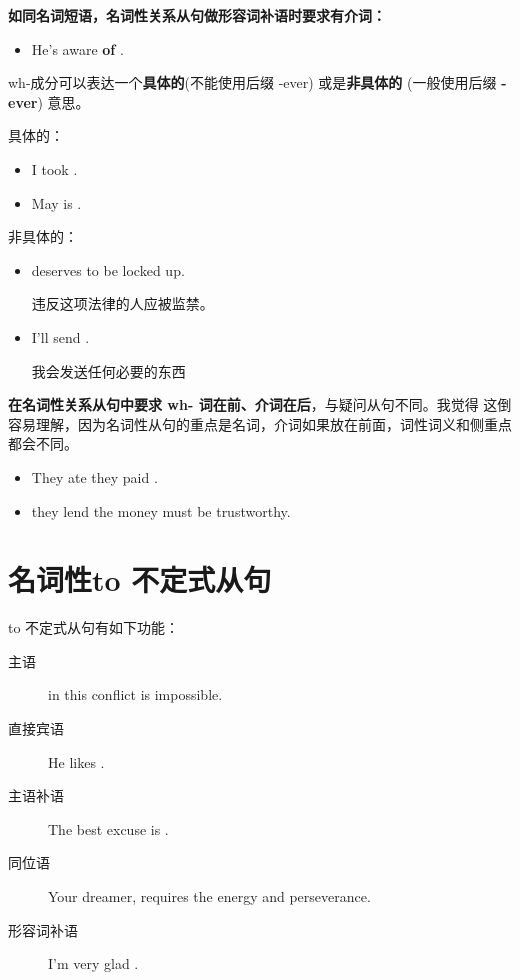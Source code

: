 \textbf{如同名词短语，名词性关系从句做形容词补语时要求有介词：}
\begin{itemize}
\item He's aware \textbf{of} .
\end{itemize}

wh-成分可以表达一个\textbf{具体的}(不能使用后缀 -ever) 或是\textbf{非具体的}
(一般使用后缀 \textbf{-ever}) 意思。

具体的：
\begin{itemize}
\item I took .
\item May is .
\end{itemize}


非具体的：
\begin{itemize}
\item {} deserves to be locked up.

  违反这项法律的人应被监禁。
\item I'll send .

  我会发送任何必要的东西
\end{itemize}

\textbf{在名词性关系从句中要求 wh- 词在前、介词在后}，与疑问从句不同。我觉得
这倒容易理解，因为名词性从句的重点是名词，介词如果放在前面，词性词义和侧重点
都会不同。
\begin{itemize}
\item They ate  they paid .
\item {} they lend the money  must be trustworthy.
\end{itemize}

\section{名词性to 不定式从句}

to 不定式从句有如下功能：
\begin{description}
\item[主语]  in this conflict is impossible.
\item[直接宾语] He likes .
\item[主语补语] The best excuse is .

\item[同位语] Your dreamer,  requires the
  energy and perseverance.

\item[形容词补语] I'm very glad .
\end{description}


